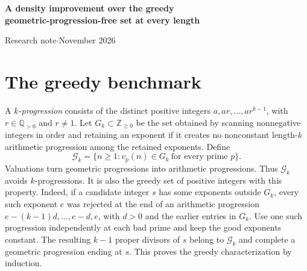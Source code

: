 \documentclass[11pt]{article}
\newcommand{\GP}{\mathcal G_k}
\begin{document}
\begin{center}
{\LARGE\bfseries A density improvement over the greedy\\[3pt] geometric-progression-free set at every length}\par
\vspace{7pt}
{\small Research note\quad$\cdot$\quad November 2026}
\end{center}

\begin{abstract}
Brown and Gordon asked whether a set of positive integers avoiding geometric progressions can have ordinary natural density greater than that of the greedy sequence. For every length $k\ge3$ we construct such a set by coupling prime valuations. The construction works for all positive rational ratios and applies directly at composite lengths, where the greedy exponent set has no known general digit formula. More generally, every fixed bound on the number of primes that can be tested jointly in disjoint blocks imposes a strict density loss. We give an effective approximation to the unrestricted supremum. We can prescribe small independent density increases in individual reduced residue classes. The starting point is an earlier three-term construction in the supplied ProveIt collection.
\end{abstract}

\section{The greedy benchmark}

A \emph{$k$-progression} consists of the distinct positive integers $a,ar,\ldots,ar^{k-1}$, with $r\in\mathbb Q_{>0}$ and $r\ne1$. Let $G_k\subset\mathbb Z_{\ge0}$ be the set obtained by scanning nonnegative integers in order and retaining an exponent if it creates no nonconstant length-$k$ arithmetic progression among the retained exponents. Define
\[
    \GP=\{n\ge1 : v_p(n)\in G_k\ \text{for every prime }p\}.
\]
Valuations turn geometric progressions into arithmetic progressions. Thus $\GP$ avoids $k$-progressions. It is also the greedy set of positive integers with this property. Indeed, if a candidate integer $s$ has some exponents outside $G_k$, every such exponent $e$ was rejected at the end of an arithmetic progression $e-(k-1)d,\ldots,e-d,e$, with $d>0$ and the earlier entries in $G_k$. Use one such progression independently at each bad prime and keep the good exponents constant. The resulting $k-1$ proper divisors of $s$ belong to $\GP$ and complete a geometric progression ending at $s$. This proves the greedy characterization by induction.
\end{document}
